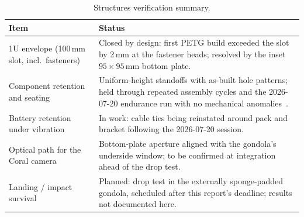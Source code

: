 \begin{table}[H]
  \centering
  \caption{Structures verification summary.}
  \label{tab:structverif}
  \begin{tabular}{p{}p{}}
    \toprule
    Item & Status \\
    \midrule
    1U envelope (100\,mm slot, incl.\ fasteners) &
    Closed by design: first PETG build exceeded the slot by 2\,mm at the
    fastener heads; resolved by the inset $95 \times 95$\,mm bottom plate. \\
    Component retention and seating &
    Uniform-height standoffs with as-built hole patterns; held through
    repeated assembly cycles and the 2026-07-20 endurance run with no
    mechanical anomalies~\cite{anomaly}. \\
    Battery retention under vibration &
    In work: cable ties being reinstated around pack and bracket following
    the 2026-07-20 session. \\
    Optical path for the Coral camera &
    Bottom-plate aperture aligned with the gondola's underside window; to
    be confirmed at integration ahead of the drop test. \\
    Landing / impact survival &
    Planned: drop test in the externally sponge-padded gondola, scheduled
    after this report's deadline; results not documented here. \\
    \bottomrule
  \end{tabular}
\end{table}
